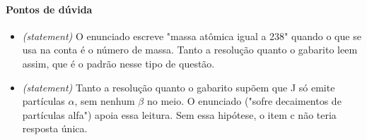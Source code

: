 \documentclass{article}%
\begin{document}
\paragraph{Pontos de dúvida}%
\begin{itemize}%
\item%
\textit{(statement)} O enunciado escreve "massa atômica igual a 238" quando o que se usa na conta é o número de massa. Tanto a resolução quanto o gabarito leem assim, que é o padrão nesse tipo de questão.%
\item%
\textit{(statement)} Tanto a resolução quanto o gabarito supõem que J só emite partículas $\alpha$, sem nenhum $\beta$ no meio. O enunciado ("sofre decaimentos de partículas alfa") apoia essa leitura. Sem essa hipótese, o item c não teria resposta única.%
\end{itemize}%
\end{document}
